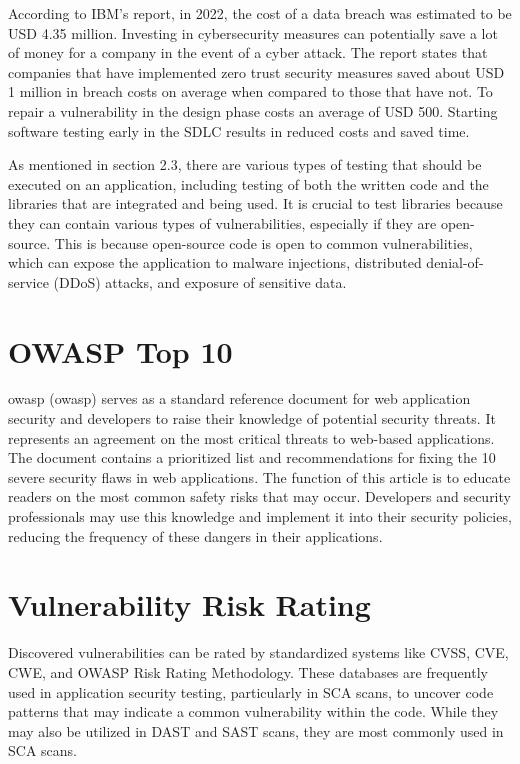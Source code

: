 According to IBM's report, in 2022, the cost of a data breach was estimated to be USD 4.35 million\cite{databreach}. Investing in cybersecurity measures can potentially save a lot of money for a company in the event of a cyber attack. The report states that companies that have implemented zero trust security measures saved about USD 1 million in breach costs on average when compared to those that have not. To repair a vulnerability in the design phase costs an average of USD 500\cite{fixvulnerability}. Starting software testing early in the SDLC results in reduced costs and saved time. 

As mentioned in section 2.3, there are various types of testing that should be executed on an application, including testing of both the written code and the libraries that are integrated and being used. It is crucial to test libraries because they can contain various types of vulnerabilities, especially if they are open-source. This is because open-source code is open to common vulnerabilities, which can expose the application to malware injections, distributed denial-of-service (DDoS) attacks, and exposure of sensitive data. \cite{testlibaries}

\section{OWASP Top 10}
\acrlong{owasp} (\acrshort{owasp}) serves as a standard reference document for web application security and developers to raise their knowledge of potential security threats. It represents an agreement on the most critical threats to web-based applications. The document contains a prioritized list and recommendations for fixing the 10 severe security flaws in web applications. The function of this article is to educate readers on the most common safety risks that may occur. Developers and security professionals may use this knowledge and implement it into their security policies, reducing the frequency of these dangers in their applications. 


\section{Vulnerability Risk Rating}
Discovered vulnerabilities can be rated by standardized systems like CVSS, CVE, CWE, and OWASP Risk Rating Methodology. These databases are frequently used in application security testing, particularly in SCA scans, to uncover code patterns that may indicate a common vulnerability within the code. While they may also be utilized in DAST and SAST scans, they are most commonly used in SCA scans. 


